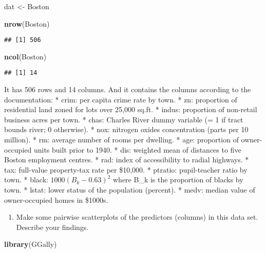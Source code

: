 \documentclass[]{article}
\newenvironment{Shaded}{\begin{snugshade}}{\end{snugshade}}
\newcommand{\KeywordTok}[1]{\textcolor[rgb]{0.13,0.29,0.53}{\textbf{#1}}}
\newcommand{\NormalTok}[1]{#1}
\newcommand{\StringTok}[1]{\textcolor[rgb]{0.31,0.60,0.02}{#1}}
\providecommand{\tightlist}{%
  \setlength{\itemsep}{0pt}\setlength{\parskip}{0pt}}
\begin{document}
\begin{Shaded}
\begin{Highlighting}[]
\NormalTok{dat <-}\StringTok{ }\NormalTok{Boston}

\KeywordTok{nrow}\NormalTok{(Boston)}
\end{Highlighting}
\end{Shaded}

\begin{verbatim}
## [1] 506
\end{verbatim}

\begin{Shaded}
\begin{Highlighting}[]
\KeywordTok{ncol}\NormalTok{(Boston)}
\end{Highlighting}
\end{Shaded}

\begin{verbatim}
## [1] 14
\end{verbatim}

It has 506 rows and 14 columns. And it contains the columns according to
the documentation: * crim: per capita crime rate by town. * zn:
proportion of residential land zoned for lots over 25,000 sq.ft. *
indus: proportion of non-retail business acres per town. * chas: Charles
River dummy variable (= 1 if tract bounds river; 0 otherwise). * nox:
nitrogen oxides concentration (parts per 10 million). * rm: average
number of rooms per dwelling. * age: proportion of owner-occupied units
built prior to 1940. * dis: weighted mean of distances to five Boston
employment centres. * rad: index of accessibility to radial highways. *
tax: full-value property-tax rate per \$10,000. * ptratio: pupil-teacher
ratio by town. * black: \(1000(B_k - 0.63)^2\) where B\_k is the
proportion of blacks by town. * lstat: lower status of the population
(percent). * medv: median value of owner-occupied homes in \$1000s.

\begin{enumerate}
\def\labelenumi{(\alph{enumi})}
\setcounter{enumi}{1}
\tightlist
\item
  Make some pairwise scatterplots of the predictors (columns) in this
  data set. Describe your findings.
\end{enumerate}

\begin{Shaded}
\begin{Highlighting}[]
\KeywordTok{library}\NormalTok{(GGally)}
\end{Highlighting}
\end{Shaded}
\end{document}
